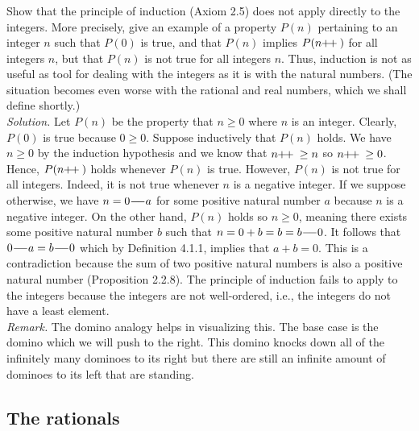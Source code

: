 \documentclass{amsart}
\theoremstyle{definition}
\newcommand{\soln}{\newline\textit{Solution.} }
\newcommand{\pls}{\mathop{\hspace{-2pt}+\hspace{-3.5pt}+{}}}
\newcommand{\mns}{\hspace{-2pt}-\hspace{-4.1pt}-{}}
\begin{document}
\subsubsection{} Show that the principle of induction (Axiom 2.5) does not apply directly to the integers. More precisely, give an example of a property $P(n)$ pertaining to an integer $n$ such that $P(0)$ is true, and that $P(n)$ implies $P(n\pls)$ for all integers $n$, but that $P(n)$ is not true for all integers $n$. Thus, induction is not as useful as tool for dealing with the integers as it is with the natural numbers. (The situation becomes even worse with the rational and real numbers, which we shall define shortly.) \\
\soln Let $P(n)$ be the property that $n\geq 0$ where $n$ is an integer. Clearly, $P(0)$ is true because $0\geq 0$. Suppose inductively that $P(n)$ holds. We have $n\geq 0$ by the induction hypothesis and we know that $n\pls\geq n$ so $n\pls \geq 0$. Hence, $P(n\pls)$ holds whenever $P(n)$ is true. However, $P(n)$ is not true for all integers. Indeed, it is not true whenever $n$ is a negative integer. If we suppose otherwise, we have $n=0\mns a$ for some positive natural number $a$ because $n$ is a negative integer. On the other hand, $P(n)$ holds so $n\geq 0$, meaning there exists some positive natural number $b$ such that $n=0+b=b=b\mns 0$. It follows that $0\mns a=b\mns 0$ which by Definition 4.1.1, implies that $a+b=0$. This is a contradiction because the sum of two positive natural numbers is also a positive natural number (Proposition 2.2.8). The principle of induction fails to apply to the integers because the integers are not well-ordered, i.e., the integers do not have a least element. \\

\textit{Remark.} The domino analogy helps in visualizing this. The base case is the domino which we will push to the right. This domino knocks down all of the infinitely many dominoes to its right but there are still an infinite amount of dominoes to its left that are standing. \\


\subsection{The rationals}
\end{document}
